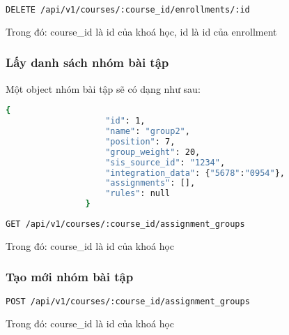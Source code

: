 \documentclass[../Thesis.tex]{subfiles}
\begin{document}
                \begin{lstlisting}[language=bash]
                DELETE /api/v1/courses/:course_id/enrollments/:id
                \end{lstlisting}
    
                Trong đó: course\_id là id của khoá học, id là id của enrollment

            \subsubsection{Lấy danh sách nhóm bài tập}
                Một object nhóm bài tập sẽ có dạng như sau:

                \begin{lstlisting}[language=bash]
                {
                    "id": 1,
                    "name": "group2",
                    "position": 7,
                    "group_weight": 20,
                    "sis_source_id": "1234",
                    "integration_data": {"5678":"0954"},
                    "assignments": [],
                    "rules": null
                }
                \end{lstlisting}

                \begin{lstlisting}[language=bash]
                GET /api/v1/courses/:course_id/assignment_groups
                \end{lstlisting}

                Trong đó: course\_id là id của khoá học

            \subsubsection{Tạo mới nhóm bài tập}

                \begin{lstlisting}[language=bash]
                POST /api/v1/courses/:course_id/assignment_groups
                \end{lstlisting}

                Trong đó: course\_id là id của khoá học
\end{document}
